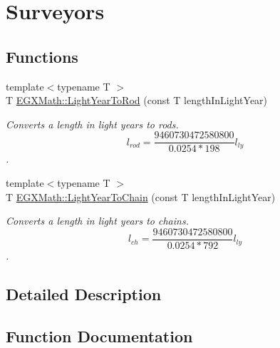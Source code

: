 \hypertarget{group___e_g_x_math-_conversions-_length_conversions-_astronomical-_light_year-_surveyors}{}\section{Surveyors}
\label{group___e_g_x_math-_conversions-_length_conversions-_astronomical-_light_year-_surveyors}
\subsection*{Functions}
\begin{DoxyCompactItemize}
\item 
{\footnotesize template$<$typename T $>$ }\\T \mbox{\hyperlink{group___e_g_x_math-_conversions-_length_conversions-_astronomical-_light_year-_surveyors_ga8cb7f2e1dbbe56d0d87ce11015d4fdb6}{E\+G\+X\+Math\+::\+Light\+Year\+To\+Rod}} (const T length\+In\+Light\+Year)
\begin{DoxyCompactList}\small\item\em Converts a length in light years to rods. \[ l_{rod}= \frac{9460730472580800}{0.0254 * 198} l_{ly} \]. \end{DoxyCompactList}\item 
{\footnotesize template$<$typename T $>$ }\\T \mbox{\hyperlink{group___e_g_x_math-_conversions-_length_conversions-_astronomical-_light_year-_surveyors_gabfcaf18acf4aeceaaed2699ebc9c3e1d}{E\+G\+X\+Math\+::\+Light\+Year\+To\+Chain}} (const T length\+In\+Light\+Year)
\begin{DoxyCompactList}\small\item\em Converts a length in light years to chains. \[ l_{ch}= \frac{9460730472580800}{0.0254 * 792} l_{ly} \]. \end{DoxyCompactList}\end{DoxyCompactItemize}


\subsection{Detailed Description}


\subsection{Function Documentation}
\mbox{\label{group___e_g_x_math-_conversions-_length_conversions-_astronomical-_light_year-_surveyors_gabfcaf18acf4aeceaaed2699ebc9c3e1d}} 
